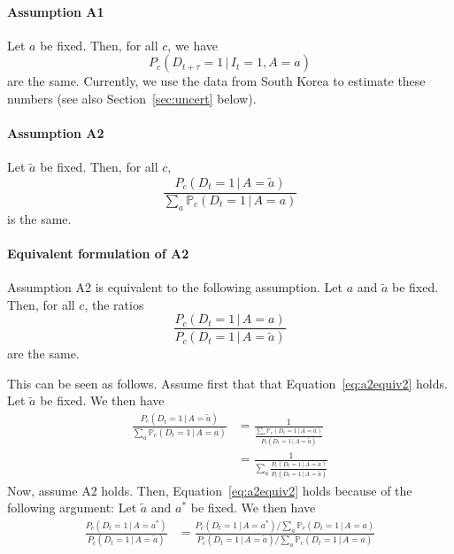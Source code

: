 \documentclass[a4paper]{article}
\renewcommand\P{\mathbb{P}}
\newcommand{\given}{\, \vert \,}
\begin{document}

\paragraph{Assumption A1} Let $a$ be fixed. Then, for all $c$, we have
\begin{equation}
P_c(D_{t+\tau} = 1\,|\,I_t = 1, A = a)
\end{equation}
are the same. 
Currently, we use the data from South Korea to 
estimate these numbers (see also Section~\ref{sec:uncert} below). 



\paragraph{Assumption A2}
Let $\tilde{a}$ be fixed. Then, for all $c$,
\begin{equation} \label{eq:a2equiv}
\frac{P_c(D_t = 1\,|\,A = \tilde{a})}
{\sum_a \P_c(D_t = 1\,|\,A = a)}
\end{equation}
is the same.





\paragraph{Equivalent formulation of A2}
Assumption A2 is equivalent to the following assumption. 
Let $a$ and $\tilde{a}$ be fixed. Then, for all $c$, the ratios 
\begin{equation} \label{eq:a2equiv2}
\frac{P_c(D_t = 1\,|\,A = a)}{P_c(D_t = 1\,|\,A = \tilde{a})}
\end{equation}
are the same. 

{\color{gray} This can be seen as follows. Assume first that 
that Equation~\eqref{eq:a2equiv2} holds. Let $\tilde{a}$ be fixed. We then have 
\begin{align*}
\frac{P_c(D_t = 1\,|\,A = \tilde{a})}
{\sum_a \P_c(D_t = 1\,|\,A = a)}
&= 
\frac{1}{\frac{\sum_a \P_c(D_t = 1\,|\,A = a)}{P_c(D_t = 1\,|\,A = \tilde{a})}
}\\
&= 
\frac{1}{\sum_a \frac{P_c(D_t = 1\,|\,A = a)}{P_c(D_t = 1\,|\,A = \tilde{a})}
}
\end{align*}
Now, assume 
A2 holds. Then, Equation~\eqref{eq:a2equiv2} holds because of the following argument:  Let $\tilde{a}$ and $a^*$ be fixed. We then have
\begin{align*}
\frac{P_c(D_t = 1\,|\,A = a^*)}
{P_c(D_t = 1\,|\,A = \tilde{a})}
&= 
\frac{P_c(D_t = 1\,|\,A = a^*)/\sum_a \P_c(D_t = 1\,|\,A = a)
}
{P_c(D_t = 1\,|\,A = \tilde{a})/\sum_a \P_c(D_t = 1\,|\,A = a)
}
\end{align*}}
\end{document}
